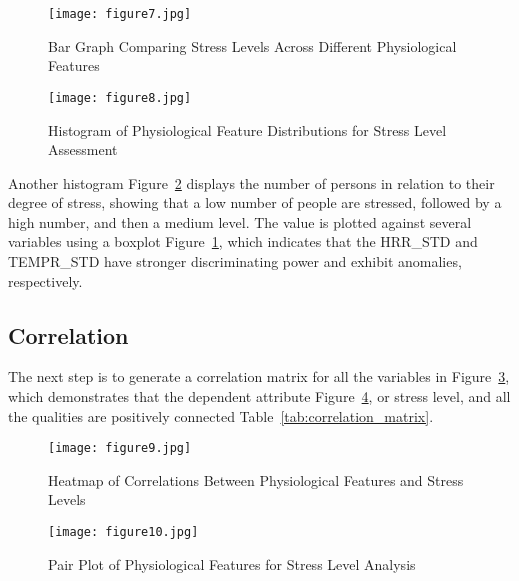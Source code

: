 \documentclass{article}
\begin{document}
\begin{figure}[htbp]
  \centering
  \texttt{[image: figure7.jpg]}
    \caption{Bar Graph Comparing Stress Levels Across Different Physiological Features}
  \label{fig:figure7}
\end{figure}









\begin{figure}[htbp]
    \centering
    \texttt{[image: figure8.jpg]}
    \caption{Histogram of Physiological Feature Distributions for Stress Level Assessment}
  \label{fig:figure8}
\end{figure}


Another histogram Figure~\ref{fig:figure8} displays the number of persons in relation to their degree of stress, showing that a low number of people are stressed, followed by a high number, and then a medium level. The value is plotted against several variables using a boxplot Figure~\ref{fig:figure7}, which indicates that the HRR\_STD and TEMPR\_STD have stronger discriminating power and exhibit anomalies, respectively.




\subsection{Correlation}
The next step is to generate a correlation matrix for all the variables in Figure~\ref{fig:figure19}, which demonstrates that the dependent attribute Figure~\ref{fig:figure10}, or stress level, and all the qualities are positively connected Table~\ref{tab:correlation_matrix}.

\begin{figure}[htbp]
    \centering
    \texttt{[image: figure9.jpg]}
    \caption{Heatmap of Correlations Between Physiological Features and Stress Levels}
    \label{fig:figure19}
\end{figure}


\begin{figure}[htbp]
    \centering
    \texttt{[image: figure10.jpg]}
    \caption{Pair Plot of Physiological Features for Stress Level Analysis}
    \label{fig:figure10}
\end{figure}
\end{document}
